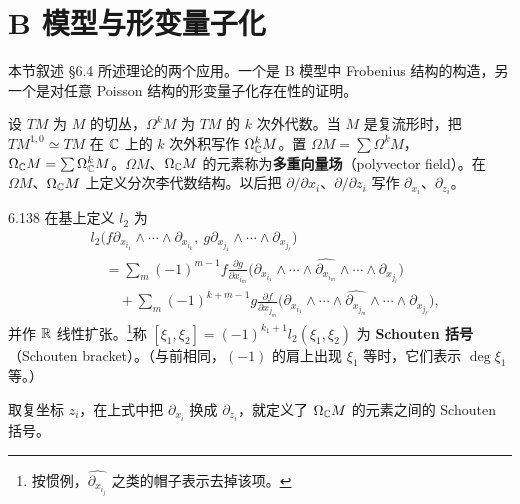 
\section{B 模型与形变量子化}


本节叙述 §6.4 所述理论的两个应用。一个是 B 模型中 Frobenius 结构的构造，另一个是对任意 Poisson 结构的形变量子化存在性的证明。

设 $TM$ 为 $M$ 的切丛，$\Omega^kM$ 为 $TM$ 的 $k$ 次外代数。当 $M$ 是复流形时，把 $TM^{1,0}\simeq TM$ 在 $\mathbb{C}$ 上的 $k$ 次外积写作 $\Omega^k_{\mathbb{C}}M$。置 $\Omega M=\sum\Omega^kM$，$\Omega_{\mathbb{C}}M=\sum\Omega^k_{\mathbb{C}}M$。$\Omega M$、$\Omega_{\mathbb{C}}M$ 的元素称为\textbf{多重向量场}（polyvector field）。在 $\Omega M$、$\Omega_{\mathbb{C}}M$ 上定义分次李代数结构。以后把 $\partial/\partial x_i$、$\partial/\partial z_i$ 写作 $\partial_{x_i}$、$\partial_{z_i}$。

\begin{definition}{6.138}
  在基上定义 $l_2$ 为
  \begin{align*}
    &l_2\bigl(f\partial_{x_{i_1}}\wedge\cdots\wedge\partial_{x_{i_k}},\ g\partial_{x_{j_1}}\wedge\cdots\wedge\partial_{x_{j_\ell}}\bigr)\\
    &\quad=\sum_m(-1)^{m-1}f\frac{\partial g}{\partial x_{i_m}}
      \bigl(\partial_{x_{i_1}}\wedge\cdots\wedge\widehat{\partial_{x_{i_m}}}\wedge\cdots\wedge\partial_{x_{j_\ell}}\bigr)\\
    &\qquad+\sum_m(-1)^{k+m-1}g\frac{\partial f}{\partial x_{j_m}}
      \bigl(\partial_{x_{i_1}}\wedge\cdots\wedge\widehat{\partial_{x_{j_m}}}\wedge\cdots\wedge\partial_{x_{j_\ell}}\bigr),
  \end{align*}
  并作 $\mathbb{R}$ 线性扩张。\footnote{按惯例，$\widehat{\partial_{x_{i_j}}}$ 之类的帽子表示去掉该项。}称 $[\xi_1,\xi_2]=(-1)^{k_1+1}l_2(\xi_1,\xi_2)$ 为 \textbf{Schouten 括号}（Schouten bracket）。（与前相同，$(-1)$ 的肩上出现 $\xi_1$ 等时，它们表示 $\deg\xi_1$ 等。）

  取复坐标 $z_i$，在上式中把 $\partial_{x_i}$ 换成 $\partial_{z_i}$，就定义了 $\Omega_{\mathbb{C}}M$ 的元素之间的 Schouten 括号。
\end{definition}

